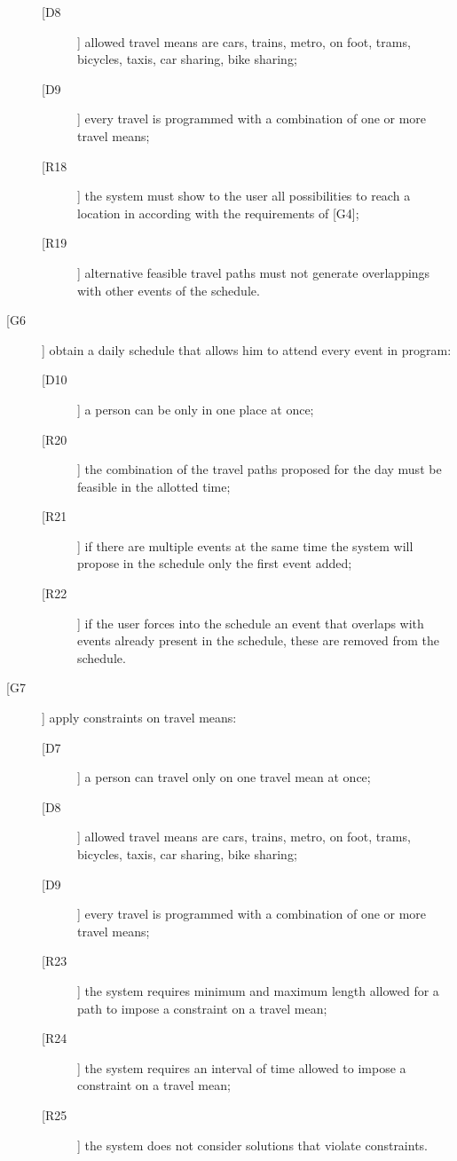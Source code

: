 \begin{description}
\begin{description}
	\item[[D8]] allowed travel means are cars, trains, metro, on foot, trams, bicycles, taxis, car sharing, bike sharing;
	\item[[D9]] every travel is programmed with a combination of one or more travel means;
	\newline
	\item[[R18]] the system must show to the user all possibilities to reach a location in according with the requirements of [G4];
	\item[[R19]] alternative feasible travel paths must not generate overlappings with other events of the schedule.
	\end{description}
\item[[G6]] obtain a daily schedule that allows him to attend every event in program:
	\begin{description}
	\item[[D10]] a person can be only in one place at once;
	\newline
	\item[[R20]] the combination of the travel paths proposed for the day must be feasible in the allotted time;
	\item[[R21]] if there are multiple events at the same time the system will propose in the schedule only the first event added;
	\item[[R22]] if the user forces into the schedule an event that overlaps with events already present in the schedule, these are removed from the schedule.
	\end{description}
\item[[G7]] apply constraints on travel means:
	\begin{description}
	\item[[D7]] a person can travel only on one travel mean at once; 
	\item[[D8]] allowed travel means are cars, trains, metro, on foot, trams, bicycles, taxis, car sharing, bike sharing;	
	\item[[D9]] every travel is programmed with a combination of one or more travel means;
	\newline
	\item[[R23]] the system requires minimum and maximum length allowed for a path to impose a constraint on a travel mean;
	\item[[R24]] the system requires an interval of time allowed to impose a constraint on a travel mean;
	\item[[R25]] the system does not consider solutions that violate constraints.

\end{description}
\end{description}
